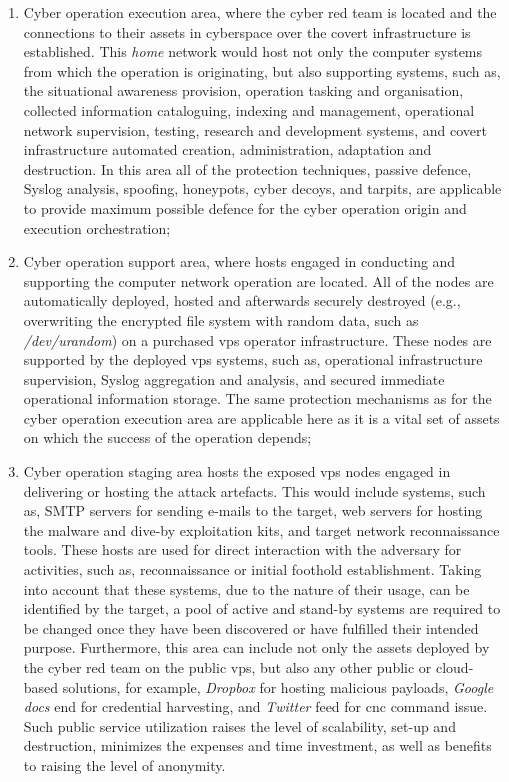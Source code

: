 \begin{enumerate}
    \item Cyber operation execution area, where the cyber red team is located and the connections to their assets in cyberspace over the covert infrastructure is established. This \textit{home} network would host not only the computer systems from which the operation is originating, but also supporting systems, such as, the situational awareness provision, operation tasking and organisation, collected information cataloguing, indexing and management, operational network supervision, testing, research and development systems, and covert infrastructure automated creation, administration, adaptation and destruction.
    In this area all of the protection techniques, passive defence, Syslog analysis, spoofing, honeypots, cyber decoys, and tarpits, are applicable to provide maximum possible defence for the cyber operation origin and execution orchestration;
    \item Cyber operation support area, where hosts engaged in conducting and supporting the computer network operation are located. All of the nodes are automatically deployed, hosted and afterwards securely destroyed (e.g., overwriting the encrypted file system with random data, such as \textit{/dev/urandom}) on a purchased \gls{vps} operator infrastructure. These nodes are supported by the deployed \gls{vps} systems, such as, operational infrastructure supervision, Syslog aggregation and analysis, and secured immediate operational information storage.
    The same protection mechanisms as for the cyber operation execution area are applicable here as it is a vital set of assets on which the success of the operation depends;
    \item Cyber operation staging area hosts the exposed \gls{vps} nodes engaged in delivering or hosting the attack artefacts. This would include systems, such as, SMTP servers for sending e-mails to the target, web servers for hosting the malware and dive-by exploitation kits, and target network reconnaissance tools. These hosts are used for direct interaction with the adversary for activities, such as, reconnaissance or initial foothold establishment. Taking into account that these systems, due to the nature of their usage, can be identified by the target, a pool of active and stand-by systems are required to be changed once they have been discovered or have fulfilled their intended purpose.
    Furthermore, this area can include not only the assets deployed by the cyber red team on the public \gls{vps}, but also any other public or cloud-based solutions, for example, \textit{Dropbox} for hosting malicious payloads, \textit{Google docs} end for credential harvesting, and \textit{Twitter} feed for \gls{cnc} command issue. Such public service utilization raises the level of scalability, set-up and destruction, minimizes the expenses and time investment, as well as benefits to raising the level of anonymity.

\end{enumerate}

